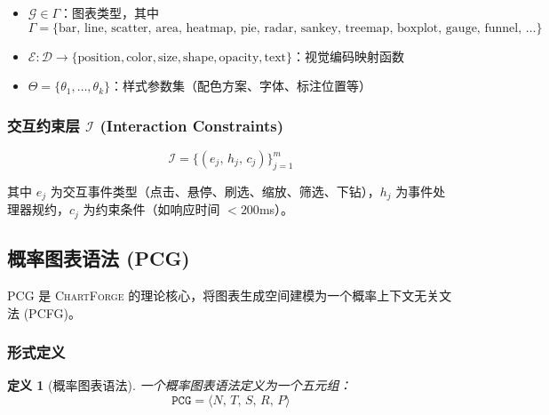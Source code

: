 \documentclass[12pt,a4paper]{ctexart}
\newtheorem{definition}{定义}[section]
\theoremstyle{remark}
\newcommand{\ChartForge}{\textsc{ChartForge}}
\newcommand{\PCG}{\texttt{PCG}}
\begin{document}
\begin{itemize}[leftmargin=*]
    \item $\mathcal{G} \in \Gamma$：图表类型，其中
    \begin{equation*}
        \Gamma = \{\text{bar},\, \text{line},\, \text{scatter},\, \text{area},\, \text{heatmap},\,
                  \text{pie},\, \text{radar},\, \text{sankey},\, \text{treemap},\,
                  \text{boxplot},\, \text{gauge},\, \text{funnel},\, \dots\}
    \end{equation*}
    \item $\mathcal{E}: \mathcal{D} \to \{\text{position}, \text{color}, \text{size}, \text{shape}, \text{opacity}, \text{text}\}$：视觉编码映射函数
    \item $\Theta = \{\theta_1, \dots, \theta_k\}$：样式参数集（配色方案、字体、标注位置等）
\end{itemize}

\subsubsection{交互约束层 $\mathcal{I}$ (Interaction Constraints)}

\begin{equation}
    \mathcal{I} = \big\{ (e_j,\, h_j,\, c_j) \big\}_{j=1}^{m}
\end{equation}

其中 $e_j$ 为交互事件类型（点击、悬停、刷选、缩放、筛选、下钻），$h_j$ 为事件处理器规约，$c_j$ 为约束条件（如响应时间 $< 200$ms）。

\subsection{概率图表语法 (PCG)}\label{sec:pcg}

PCG 是 \ChartForge{} 的理论核心，将图表生成空间建模为一个概率上下文无关文法 (PCFG)。

\subsubsection{形式定义}

\begin{definition}[概率图表语法]
一个概率图表语法定义为一个五元组：
\begin{equation}\label{eq:pcg}
    \PCG = \langle N,\, T,\, S,\, R,\, P \rangle
\end{equation}
\end{definition}
\end{document}
